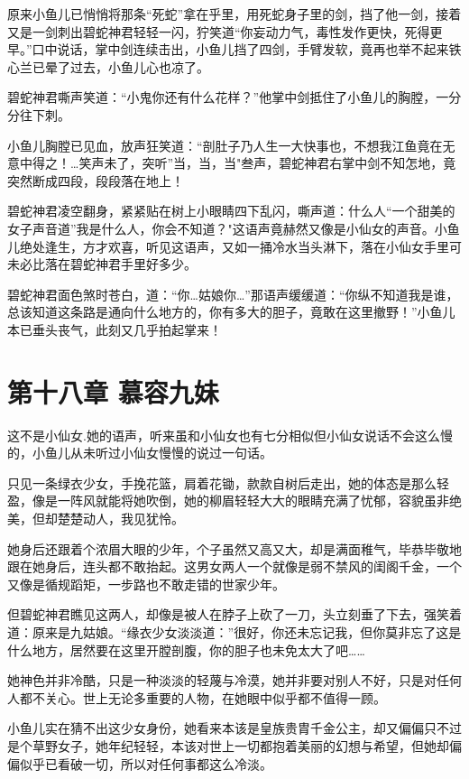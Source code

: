 \documentclass[12pt,oneside]{book}
\begin{document}
原来小鱼儿已悄悄将那条``死蛇''拿在乎里，用死蛇身子里的剑，挡了他一剑，接着又是一剑刺出碧蛇神君轻轻一闪，狞笑道``你妄动力气，毒性发作更快，死得更早。''口中说话，掌中剑连续击出，小鱼儿挡了四剑，手臂发软，竟再也举不起来铁心兰已晕了过去，小鱼儿心也凉了。

碧蛇神君嘶声笑道：``小鬼你还有什么花样？''他掌中剑抵住了小鱼儿的胸膛，一分分往下刺。

小鱼儿胸膛已见血，放声狂笑道：``剖肚子乃人生一大快事也，不想我江鱼竟在无意中得之！\ldots 笑声未了，突听''当，当，当"叁声，碧蛇神君右掌中剑不知怎地，竟突然断成四段，段段落在地上！

碧蛇神君凌空翻身，紧紧贴在树上小眼睛四下乱闪，嘶声道：什么人``一个甜美的女子声音道''我是什么人，你会不知道？"这语声竟赫然又像是小仙女的声音。小鱼儿绝处逢生，方才欢喜，听见这语声，又如一捅冷水当头淋下，落在小仙女手里可未必比落在碧蛇神君手里好多少。

碧蛇神君面色煞时苍白，道：``你\ldots 姑娘你\ldots{}''那语声缓缓道：``你纵不知道我是谁，总该知道这条路是通向什么地方的，你有多大的胆子，竟敢在这里撤野！''小鱼儿本已垂头丧气，此刻又几乎拍起掌来！

\hypertarget{ux7b2cux5341ux516bux7ae0-ux6155ux5bb9ux4e5dux59b9}{%
\chapter{第十八章
慕容九妹}\label{ux7b2cux5341ux516bux7ae0-ux6155ux5bb9ux4e5dux59b9}}

这不是小仙女.她的语声，听来虽和小仙女也有七分相似但小仙女说话不会这么慢的，小鱼儿从未听过小仙女慢慢的说过一句话。

只见一条绿衣少女，手挽花篮，肩着花锄，款款自树后走出，她的体态是那么轻盈，像是一阵风就能将她吹倒，她的柳眉轻轻大大的眼睛充满了忧郁，容貌虽非绝美，但却楚楚动人，我见犹怜。

她身后还跟着个浓眉大眼的少年，个子虽然又高又大，却是满面稚气，毕恭毕敬地跟在她身后，连头都不敢抬起。这男女两人一个就像是弱不禁风的闺阁千金，一个又像是循规蹈矩，一步路也不敢走错的世家少年。

但碧蛇神君瞧见这两人，却像是被人在脖子上砍了一刀，头立刻垂了下去，强笑着道：原来是九姑娘。``缘衣少女淡淡道：''很好，你还未忘记我，但你莫非忘了这是什么地方，居然要在这里开膛剖腹，你的胆子也未免太大了吧\ldots\ldots{}

她神色并非冷酷，只是一种淡淡的轻蔑与冷漠，她并非要对别人不好，只是对任何人都不关心。世上无论多重要的人物，在她眼中似乎都不值得一顾。

小鱼儿实在猜不出这少女身份，她看来本该是皇族贵胄千金公主，却又偏偏只不过是个草野女子，她年纪轻轻，本该对世上一切都抱着美丽的幻想与希望，但她却偏偏似乎已看破一切，所以对任何事都这么冷淡。
\end{document}

